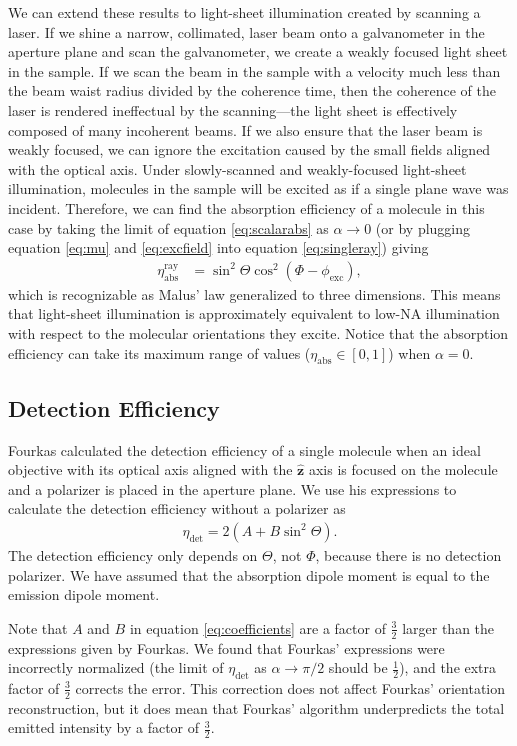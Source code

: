 \documentclass[10pt]{article}
\providecommand{\mh}[1]{\mathbf{\hat{#1}}}
\begin{document}
We can extend these results to light-sheet illumination created by scanning a
laser. If we shine a narrow, collimated, laser beam onto a galvanometer in the
aperture plane and scan the galvanometer, we create a weakly focused light sheet
in the sample. If we scan the beam in the sample with a velocity much less than
the beam waist radius divided by the coherence time, then the coherence of the
laser is rendered ineffectual by the scanning---the light sheet is effectively
composed of many incoherent beams. If we also ensure that the laser beam is
weakly focused, we can ignore the excitation caused by the small fields aligned
with the optical axis. Under slowly-scanned and weakly-focused light-sheet
illumination, molecules in the sample will be excited as if a single plane wave
was incident. Therefore, we can find the absorption efficiency of a molecule in
this case by taking the limit of equation \ref{eq:scalarabs} as
$\alpha \rightarrow 0$ (or by plugging equation \ref{eq:mu} and
\ref{eq:excfield} into equation \ref{eq:singleray}) giving
\begin{align}
  \eta_{\text{abs}}^{\text{ray}} &= \sin^2\Theta\cos^2(\Phi - \phi_{\text{exc}}),
\end{align}
which is recognizable as Malus' law generalized to three dimensions. This means
that light-sheet illumination is approximately equivalent to low-NA illumination
with respect to the molecular orientations they excite. Notice that the
absorption efficiency can take its maximum range of values
($\eta_{\text{abs}} \in [0, 1]$) when $\alpha=0$.

\subsection{Detection Efficiency}\label{detection}
Fourkas calculated the detection efficiency of a single molecule when an ideal
objective with its optical axis aligned with the $\mh{z}$ axis is focused on the
molecule and a polarizer is placed in the aperture plane\cite{fourkas2001}. We
use his expressions to calculate the detection efficiency without a polarizer as
\begin{align}
  \eta_{\text{det}} = 2(A + B\sin^2\Theta). \label{eq:scalardet}
\end{align}
The detection efficiency only depends on $\Theta$, not $\Phi$, because there is
no detection polarizer. We have assumed that the absorption dipole moment is
equal to the emission dipole moment.

Note that $A$ and $B$ in equation \ref{eq:coefficients} are a factor of
$\frac{3}{2}$ larger than the expressions given by Fourkas. We found that
Fourkas' expressions were incorrectly normalized (the limit of
$\eta_{\text{det}}$ as $\alpha\rightarrow \pi/2$ should be $\frac{1}{2}$), and
the extra factor of $\frac{3}{2}$ corrects the error. This correction does not
affect Fourkas' orientation reconstruction, but it does mean that Fourkas'
algorithm underpredicts the total emitted intensity by a factor of
$\frac{3}{2}$.
\end{document}
